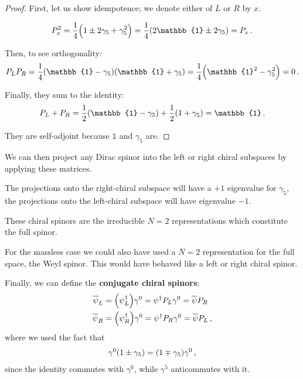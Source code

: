 \documentclass[main.tex]{subfiles}
\begin{document}
\begin{proof}
First, let us show idempotence; we denote either of \(L\) or \(R\) by \(x\).

\begin{align}
P_x^2 = \frac{1}{4} \qty(1 \pm 2 \gamma_5  + \gamma_5^2)
= \frac{1}{4} \qty(2 \mathbb{1} \pm 2 \gamma_5 ) = P_x
\,.
\end{align}

Then, to see orthogonality: 
%
\begin{align}
P_L P_R = \frac{1}{4} \qty(\mathbb{1} - \gamma_5 ) \qty(\mathbb{1} + \gamma_5 ) = \frac{1}{4} \qty(\mathbb{1}^2 - \gamma_5^2) = 0
\,.
\end{align}

Finally, they sum to the identity: 
%
\begin{align}
P_L + P_R = \frac{1}{2} \qty(\mathbb{1} - \gamma_5 ) + \frac{1}{2} \qty(1 + \gamma_5) = \mathbb{1}
\,.
\end{align}

They are self-adjoint because \(\mathbb{1}\) and \(\gamma_5 \) are.
\end{proof}

We can then project any Dirac spinor into the left or right chiral subspaces by applying these matrices. 

The projections onto the right-chiral subspace will have a \(+1 \) eigenvalue for \(\gamma_5 \), the projections onto the left-chiral subspace will have eigenvalue \(-1\).

These chiral spinors are the irreducible \(N=2\) representations which constitute the full spinor.

For the massless case we could also have used a \(N=2\) representation for the full space, the Weyl spinor. This would have behaved like a left or right chiral spinor.

Finally, we can define the \textbf{conjugate chiral spinors}: 
%
\begin{subequations}
\begin{align}
\overline{\psi}_{L} &= \qty(\psi_{L} ^\dag) \gamma^{0} 
= \psi ^\dag P_L \gamma^{0} = \overline{\psi} P_R \\
\overline{\psi}_{R} &= \qty(\psi_{R} ^\dag) \gamma^{0} 
= \psi ^\dag P_R \gamma^{0} = \overline{\psi} P_L 
\,,
\end{align}
\end{subequations}
%
where we used the fact that 
%
\begin{align}
\gamma^{0} \qty(1 \pm \gamma_5 ) 
= \qty(1 \mp \gamma_5 ) \gamma^{0}
\,,
\end{align}
%
since the identity commutes with \(\gamma^{0}\), while \(\gamma^{5}\) anticommutes with it.
\end{document}
